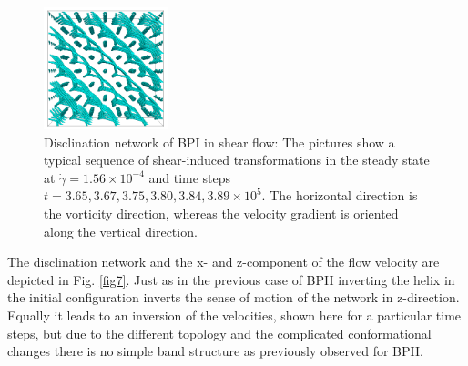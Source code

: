 \documentclass[aps,pre,reprint,superscriptaddress]{revtex4}
\newcommand{\e}[1]{\times10^{#1}}
\begin{document}
\begin{figure}[h]
\includegraphics[width=0.32\textwidth]{disc-389k_run914.png}
\caption{Disclination network of BPI in shear flow: The pictures show a typical sequence of shear-induced transformations in the steady state at $\dot{\gamma}=1.56\e{-4}$ and time steps $t=3.65, 3.67,3.75,3.80,3.84,3.89\e{5}$. The horizontal direction is the vorticity direction, whereas the velocity gradient is oriented along the vertical direction.}
\label{bp1-med}
\end{figure}

The disclination network and the x- and z-component of the flow velocity are depicted in Fig. \ref{fig7}.
Just as in the previous case of BPII inverting the helix in the initial configuration inverts the sense of motion of the network in z-direction.
Equally it leads to an inversion of the velocities, shown here for a particular time steps, but due to the different topology and the complicated conformational changes there is no simple band structure as previously observed for BPII. 
\end{document}
